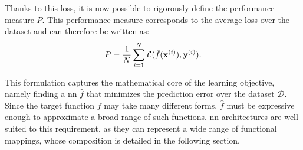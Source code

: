 Thanks to this loss, it is now possible to rigorously define the performance measure $P$.
This performance measure corresponds to the average loss over the dataset and can therefore be written as:
\begin{equation}
    P = \frac{1}{N} \sum_{i=1}^{N} \mathcal{L}(\hat{f}(\mathbf{x}^{(i)}), \mathbf{y}^{(i)}).
    \label{eq:performance_measure}
\end{equation}

This formulation captures the mathematical core of the learning objective, namely finding a \gls{nn} $\hat{f}$ that minimizes the prediction error over the dataset $\mathcal{D}$.
Since the target function $f$ may take many different forms, $\hat{f}$ must be expressive enough to approximate a broad range of such functions.
\gls{nn} architectures are well suited to this requirement, as they can represent a wide range of functional mappings, whose composition is detailed in the following section.